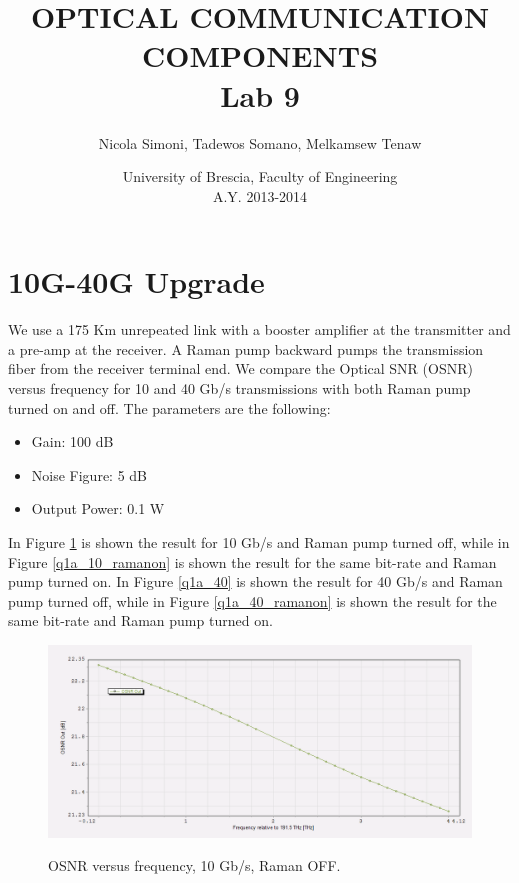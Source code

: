\documentclass[a4paper,10pt]{report}
\title{\textbf{OPTICAL COMMUNICATION COMPONENTS \\ Lab 9}}
\author{Nicola Simoni, Tadewos Somano, Melkamsew Tenaw}
\date{University of Brescia, Faculty of Engineering\\A.Y. 2013-2014}
\begin{document}
\maketitle

\section*{10G-40G Upgrade}

We use a 175 Km unrepeated link with a booster amplifier at the transmitter and a pre-amp at the receiver.
A Raman pump backward pumps the transmission fiber from the receiver terminal end.
We compare the Optical SNR (OSNR) versus frequency for 10 and 40 Gb/s transmissions with both Raman pump turned on and off.
The parameters are the following:
\begin{itemize}
 \item Gain: 100 dB
 \item Noise Figure: 5 dB
 \item Output Power: 0.1 W
\end{itemize}

In Figure \ref{q1a_10} is shown the result for 10 Gb/s and Raman pump turned off,
while in Figure \ref{q1a_10_ramanon} is shown the result for the same bit-rate and Raman pump turned on.
In Figure \ref{q1a_40} is shown the result for 40 Gb/s and Raman pump turned off,
while in Figure \ref{q1a_40_ramanon} is shown the result for the same bit-rate and Raman pump turned on.


\begin{figure}[!ht]
   \centering
   \includegraphics[width=12cm]{q1a_10.png}\\
   \caption{OSNR versus frequency, 10 Gb/s, Raman OFF.}
   \label{q1a_10}
\end{figure}
   
\end{document}
